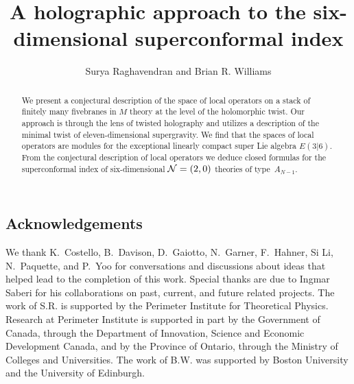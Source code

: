\documentclass[11pt]{amsart}
\begin{document}
\title{A holographic approach to the six-dimensional superconformal index}
\author{Surya Raghavendran and Brian R. Williams}
\maketitle



\begin{abstract}
We present a conjectural description of the space of local operators on a stack of finitely many fivebranes in $M$ theory at the level of the holomorphic twist.
Our approach is through the lens of twisted holography and utilizes a description of the minimal twist of eleven-dimensional supergravity. 
We find that the spaces of local operators are modules for the exceptional linearly compact super Lie algebra $E(3|6)$.
From the conjectural description of local operators we deduce closed formulas for the superconformal index of six-dimensional $\mathcal N=(2,0)$ theories of type~$A_{N-1}$.
\end{abstract}

\setcounter{tocdepth}{1}
\tableofcontents



\subsection*{Acknowledgements}
We thank K.~Costello, B.~Davison, D.~Gaiotto, N.~Garner, F.~Hahner, Si Li, N.~Paquette, and P.~Yoo for conversations and discussions about ideas that helped lead to the completion of this work. 
Special thanks are due to Ingmar Saberi for his collaborations on past, current, and future related projects.
The work of S.R. is supported by the Perimeter Institute for Theoretical Physics. Research at Perimeter Institute is supported in part by the Government of Canada, through the Department of Innovation, Science and Economic Development Canada, and by the Province of Ontario, through the Ministry of Colleges and Universities.
The work of B.W. was supported by Boston University and the University of Edinburgh. 








 




\printbibliography
\end{document}
